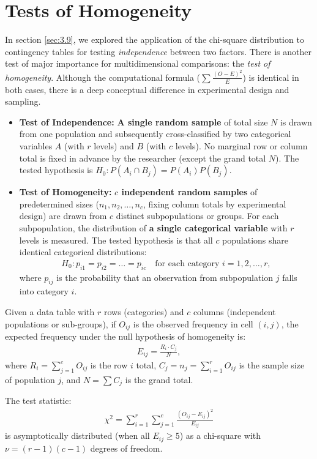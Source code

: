 \section{Tests of Homogeneity}

In section \ref{sec:3.9}, we explored the application of the chi-square distribution to contingency tables for testing \emph{independence} between two factors. There is another test of major importance for multidimensional comparisons: the \emph{test of homogeneity}. Although the computational formula ($\sum \frac{(O-E)^2}{E}$) is identical in both cases, there is a deep conceptual difference in experimental design and sampling.

\begin{definicion}
	\begin{itemize}
		\item \textbf{Test of Independence:} \textbf{A single random sample} of total size $N$ is drawn from one population and subsequently cross-classified by two categorical variables $A$ (with $r$ levels) and $B$ (with $c$ levels). No marginal row or column total is fixed in advance by the researcher (except the grand total $N$). The tested hypothesis is $H_0: P(A_i \cap B_j) = P(A_i)P(B_j)$.
		\item \textbf{Test of Homogeneity:} \textbf{$c$ independent random samples} of predetermined sizes ($n_1, n_2, \ldots, n_c$, fixing column totals by experimental design) are drawn from $c$ distinct subpopulations or groups. For each subpopulation, the distribution of \textbf{a single categorical variable} with $r$ levels is measured. The tested hypothesis is that all $c$ populations share identical categorical distributions:
		\begin{align}
			H_0: p_{i1} = p_{i2} = \ldots = p_{ic} \quad \text{for each category } i = 1, 2, \ldots, r,
		\end{align}
		where $p_{ij}$ is the probability that an observation from subpopulation $j$ falls into category $i$.
	\end{itemize}
\end{definicion}

\begin{teorema}
	Given a data table with $r$ rows (categories) and $c$ columns (independent populations or sub-groups), if $O_{ij}$ is the observed frequency in cell $(i,j)$, the expected frequency under the null hypothesis of homogeneity is:
	\begin{align}
		E_{ij} = \frac{R_i \cdot C_j}{N},
	\end{align}
	where $R_i = \sum_{j=1}^c O_{ij}$ is the row $i$ total, $C_j = n_j = \sum_{i=1}^r O_{ij}$ is the sample size of population $j$, and $N = \sum C_j$ is the grand total.
	
	The test statistic:
	\begin{align}
		\chi^2 = \sum_{i=1}^r \sum_{j=1}^c \frac{(O_{ij} - E_{ij})^2}{E_{ij}}
	\end{align}
	is asymptotically distributed (when all $E_{ij} \geq 5$) as a chi-square with $\nu = (r-1)(c-1)$ degrees of freedom.
\end{teorema}

